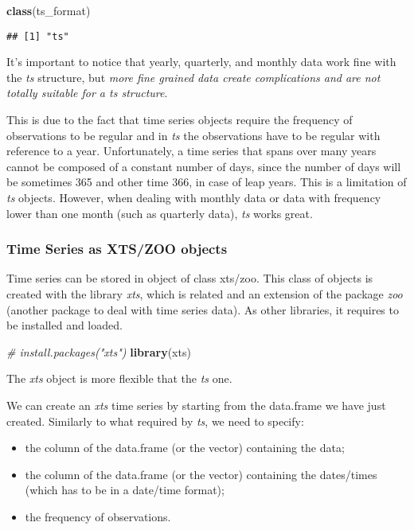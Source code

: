\documentclass[
]{article}
\newenvironment{Shaded}{\begin{snugshade}}{\end{snugshade}}
\newcommand{\CommentTok}[1]{\textcolor[rgb]{0.56,0.35,0.01}{\textit{#1}}}
\newcommand{\FunctionTok}[1]{\textcolor[rgb]{0.13,0.29,0.53}{\textbf{#1}}}
\newcommand{\NormalTok}[1]{#1}
\providecommand{\tightlist}{%
  \setlength{\itemsep}{0pt}\setlength{\parskip}{0pt}}
\begin{document}
\begin{Shaded}
\begin{Highlighting}[]
\FunctionTok{class}\NormalTok{(ts\_format)}
\end{Highlighting}
\end{Shaded}

\begin{verbatim}
## [1] "ts"
\end{verbatim}

It's important to notice that yearly, quarterly, and monthly data work fine with the \emph{ts} structure, but \emph{more fine grained data create complications and are not totally suitable for a ts structure}.

This is due to the fact that time series objects require the frequency of observations to be regular and in \emph{ts} the observations have to be regular with reference to a year. Unfortunately, a time series that spans over many years cannot be composed of a constant number of days, since the number of days will be sometimes 365 and other time 366, in case of leap years. This is a limitation of \emph{ts} objects. However, when dealing with monthly data or data with frequency lower than one month (such as quarterly data), \emph{ts} works great.

\subsubsection{Time Series as XTS/ZOO objects}\label{time-series-as-xtszoo-objects}

Time series can be stored in object of class xts/zoo. This class of objects is created with the library \emph{xts}, which is related and an extension of the package \emph{zoo} (another package to deal with time series data). As other libraries, it requires to be installed and loaded.

\begin{Shaded}
\begin{Highlighting}[]
\CommentTok{\# install.packages("xts")}
\FunctionTok{library}\NormalTok{(xts)}
\end{Highlighting}
\end{Shaded}

The \emph{xts} object is more flexible that the \emph{ts} one.

We can create an \emph{xts} time series by starting from the data.frame we have just created. Similarly to what required by \emph{ts}, we need to specify:

\begin{itemize}
\tightlist
\item
  the column of the data.frame (or the vector) containing the data;
\item
  the column of the data.frame (or the vector) containing the dates/times (which has to be in a date/time format);
\item
  the frequency of observations.
\end{itemize}
\end{document}
